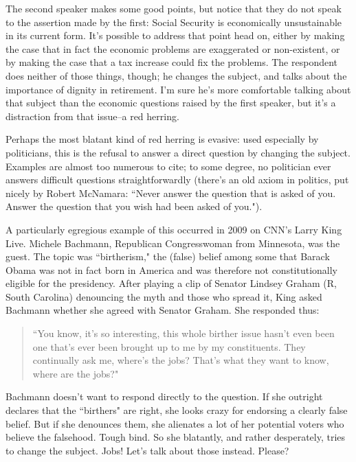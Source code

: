 The second speaker makes some good points, but notice that they do not speak to the assertion
made by the first: Social Security is economically unsustainable in its current form. It's possible
to address that point head on, either by making the case that in fact the economic problems are
exaggerated or non-existent, or by making the case that a tax increase could fix the problems. The
respondent does neither of those things, though; he changes the subject, and talks about the
importance of dignity in retirement. I'm sure he's more comfortable talking about that subject than
the economic questions raised by the first speaker, but it's a distraction from that issue--a red
herring.

Perhaps the most blatant kind of red herring is evasive: used especially by politicians, this is the
refusal to answer a direct question by changing the subject. Examples are almost too numerous to
cite; to some degree, no politician ever answers difficult questions straightforwardly (there's an
old axiom in politics, put nicely by Robert McNamara: ``Never answer the question that is asked
of you. Answer the question that you wish had been asked of you.").

A particularly egregious example of this occurred in 2009 on CNN's Larry King Live. Michele
Bachmann, Republican Congresswoman from Minnesota, was the guest. The topic was
``birtherism," the (false) belief among some that Barack Obama was not in fact born in America
and was therefore not constitutionally eligible for the presidency. After playing a clip of Senator
Lindsey Graham (R, South Carolina) denouncing the myth and those who spread it, King asked
Bachmann whether she agreed with Senator Graham. She responded thus:

\begin{quote}``You know, it's so interesting, this whole birther issue hasn't even been one that's ever been
brought up to me by my constituents. They continually ask me, where's the jobs? That's
what they want to know, where are the jobs?"\end{quote}

Bachmann doesn't want to respond directly to the question. If she outright declares that the
``birthers" are right, she looks crazy for endorsing a clearly false belief. But if she denounces them,
she alienates a lot of her potential voters who believe the falsehood. Tough bind. So she blatantly,
and rather desperately, tries to change the subject. Jobs! Let's talk about those instead. Please?

